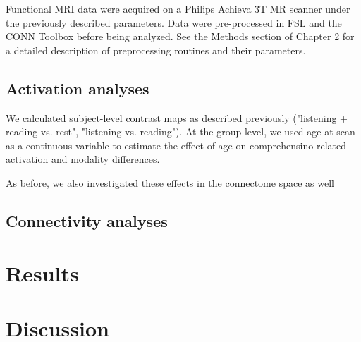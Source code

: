 Functional MRI data were acquired on a Philips Achieva 3T MR scanner under the previously described parameters. Data were pre-processed in FSL and the CONN Toolbox before being analyzed. See the Methods section of Chapter 2 for a detailed description of preprocessing routines and their parameters.

\subsection{Activation analyses}

We calculated subject-level contrast maps as described previously ("listening + reading vs. rest", "listening vs. reading"). At the group-level, we used age at scan as a continuous variable to estimate the effect of age on comprehensino-related activation and modality differences.

As before, we also investigated these effects in the connectome space as well 


\subsection{Connectivity analyses}


\section{Results}


\section{Discussion}


